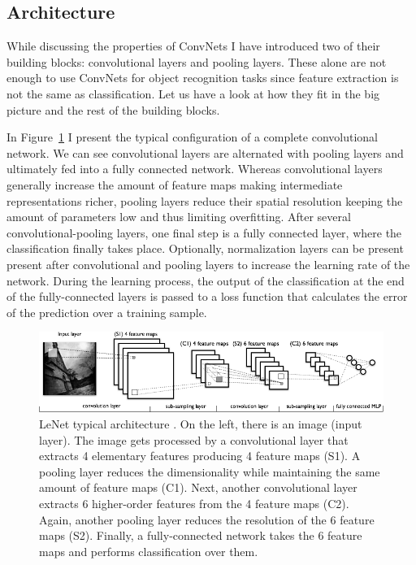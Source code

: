 \subsection{Architecture}
\label{sub:theory:convnets:achitecture}

While discussing the properties of ConvNets I have introduced two of their building blocks: convolutional layers and pooling layers.
These alone are not enough to use ConvNets for object recognition tasks since feature extraction is not the same as classification.
Let us have a look at how they fit in the big picture and the rest of the building blocks.

In Figure~\ref{fig:sec:theory:convnet} I present the typical configuration of a complete convolutional network.
We can see convolutional layers are alternated with pooling layers and ultimately fed into a fully connected network.
Whereas convolutional layers generally increase the amount of feature maps making intermediate representations richer, pooling layers reduce their spatial resolution keeping the amount of parameters low and thus limiting overfitting.
After several convolutional-pooling layers, one final step is a fully connected layer, where the classification finally takes place.
Optionally, normalization layers can be present present after convolutional and pooling layers to increase the learning rate of the network.
During the learning process, the output of the classification at the end of the fully-connected layers is passed to a loss function that calculates the error of the prediction over a training sample.

\begin{figure}[htb]
  \begin{center}
    \includegraphics[width=\textwidth]{gfx/conv-network}
  \end{center}
  \caption{
    LeNet typical architecture \cite{Lisa2010}.
    On the left, there is an image (input layer).
    The image gets processed by a convolutional layer that extracts 4 elementary features producing 4 feature maps (S1).
    A pooling layer reduces the dimensionality while maintaining the same amount of feature maps (C1).
    Next, another convolutional layer extracts 6 higher-order features from the 4 feature maps (C2).
    Again, another pooling layer reduces the resolution of the 6 feature maps (S2).
    Finally, a fully-connected network takes the 6 feature maps and performs classification over them.
  }
  \label{fig:sec:theory:convnet}
\end{figure}

